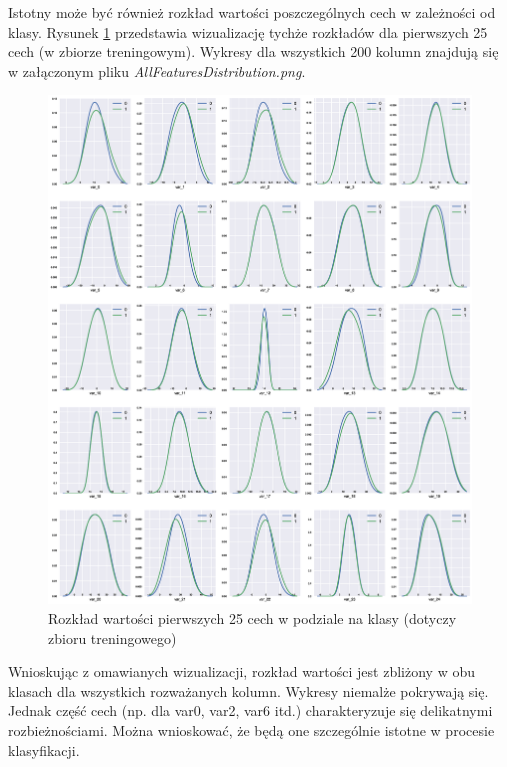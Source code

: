 \documentclass[12pt]{article}
\begin{document}
Istotny może być również rozkład wartości poszczególnych cech w zależności od klasy.
Rysunek \ref{featuresDistribution25} przedstawia wizualizację tychże rozkładów dla pierwszych 25 cech (w zbiorze treningowym). Wykresy dla wszystkich 200 kolumn znajdują się w załączonym pliku \textit{AllFeaturesDistribution.png}.

\begin{figure}[H]
\centering 
\includegraphics[width = 472pt]{feature_distribution.eps}
\caption{Rozkład wartości pierwszych 25 cech w podziale na klasy (dotyczy zbioru treningowego)}
\label{featuresDistribution25}
\end{figure}

Wnioskując z omawianych wizualizacji, rozkład wartości jest zbliżony w obu klasach dla wszystkich rozważanych kolumn. Wykresy niemalże pokrywają się. Jednak część cech (np. dla var0, var2, var6 itd.) charakteryzuje się delikatnymi rozbieżnościami. Można wnioskować, że będą one szczególnie istotne w procesie klasyfikacji.
\end{document}
